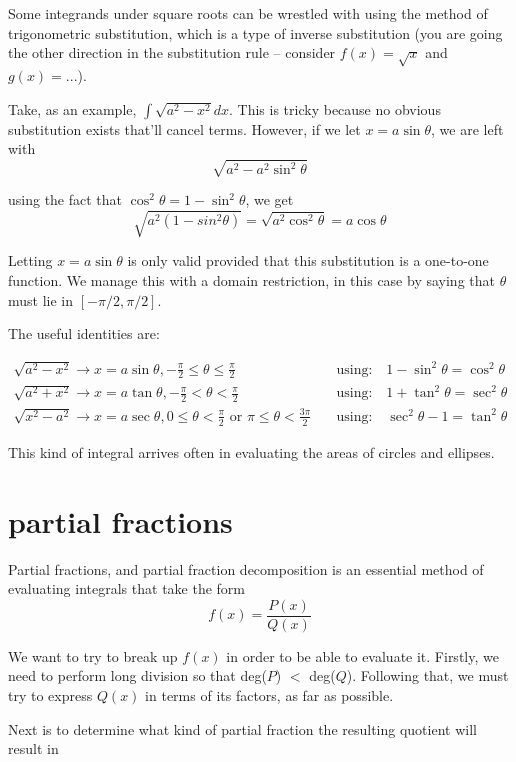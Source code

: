 \documentclass[10pt,a4paper]{report}
\begin{document}
Some integrands under square roots can be wrestled with using the method of trigonometric substitution, which is a type of inverse substitution (you are going the other direction in the substitution rule -- consider $f(x) = \sqrt{x}$ and $g(x) = ...$).

Take, as an example, $\int \sqrt{a^2 - x^2} dx$. This is tricky because no obvious substitution exists that'll cancel terms. However, if we let $x = a \sin \theta$, we are left with
$$
	\sqrt{a^2 - a^2 \sin^2 \theta}
$$

using the fact that $\cos^2 \theta = 1 - \sin^2 \theta $, we get
$$
	\sqrt{a^2 (1 - sin^2 \theta)} = \sqrt{a^2 \cos^2 \theta} = a \cos \theta
$$

Letting $x = a \sin \theta$ is only valid provided that this substitution is a one-to-one function. We manage this with a domain restriction, in this case by saying that $\theta$ must lie in $[-\pi/2, \pi/2]$.

The useful identities are:

\begin{align*}
	\sqrt{a^2 - x^2} \to x = a \sin \theta, -\frac{\pi}{2} \leq \theta \leq \frac{\pi}{2} \quad & \text{using:} \quad 1 - \sin^2 \theta = \cos^2 \theta \\
	\sqrt{a^2 + x^2} \to x = a \tan \theta, -\frac{\pi}{2} < \theta < \frac{\pi}{2} \quad & \text{using:} \quad 1 + \tan^2 \theta = \sec^2 \theta \\
	\sqrt{x^2 - a^2} \to x = a \sec \theta, 0 \leq \theta < \frac{\pi}{2} \text{ or } \pi \leq \theta < \frac{3\pi}{2} \quad & \text{using:} \quad \sec^2 \theta - 1 = \tan^2 \theta
\end{align*}

This kind of integral arrives often in evaluating the areas of circles and ellipses.

\section{partial fractions}

Partial fractions, and partial fraction decomposition is an essential method of evaluating integrals that take the form
$$
	f(x) = \frac{P(x)}{Q(x)}
$$

We want to try to break up $f(x)$ in order to be able to evaluate it. Firstly, we need to perform long division so that deg($P$) $<$ deg($Q$). Following that, we must try to express $Q(x)$ in terms of its factors, as far as possible.

Next is to determine what kind of partial fraction the resulting quotient will result in
\end{document}
